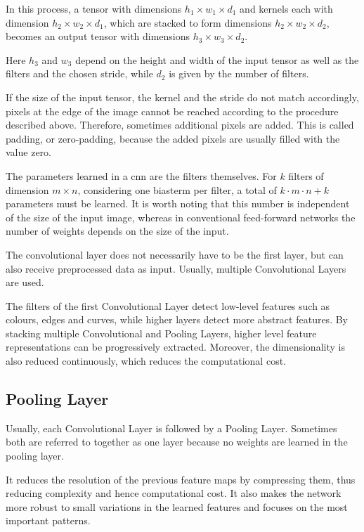 In this process, a tensor with dimensions $h_1 \times w_1 \times d_1$ and kernels each with dimension $h_2 \times w_2 \times d_1$, which are stacked to form dimensions $h_2 \times w_2 \times d_2$, becomes an output tensor with dimensions $h_3 \times w_3 \times d_2$. \cite{Arunava:2018}

Here $h_3$ and $w_3$ depend on the height and width of the input tensor as well as the filters and the chosen stride, while $d_2$ is given by the number of filters.

If the size of the input tensor, the kernel and the stride do not match accordingly, pixels at the edge of the image cannot be reached according to the procedure described above. Therefore, sometimes additional pixels are added. This is called padding, or zero-padding, because the added pixels are usually filled with the value zero. \cite{Michelucci:2019}

The parameters learned in a \ac{cnn} are the filters themselves. For $k$ filters of dimension $m \times n$, considering one biasterm per filter, a total of $k \cdot m \cdot n + k$ parameters must be learned. It is worth noting that this number is independent of the size of the input image, whereas in conventional feed-forward networks the number of weights depends on the size of the input.\cite{Michelucci:2019}

The convolutional layer does not necessarily have to be the first layer, but can also receive preprocessed data as input. Usually, multiple Convolutional Layers are used.\cite{Michelucci:2019}

The filters of the first Convolutional Layer detect low-level features such as colours, edges and curves, while higher layers detect more abstract features. By stacking multiple Convolutional and Pooling Layers, higher level feature representations can be progressively extracted. Moreover, the dimensionality is also reduced continuously, which reduces the computational cost. \cite{Gu:2018,Saha:2018}


\subsection{Pooling Layer}%

Usually, each Convolutional Layer is followed by a Pooling Layer. Sometimes both are referred to together as one layer because no weights are learned in the pooling layer. \cite{Michelucci:2019}

It reduces the resolution of the previous feature maps by compressing them, thus reducing complexity and hence computational cost. It also makes the network more robust to small variations in the learned features and focuses on the most important patterns. \cite{Namatevs:2017}


